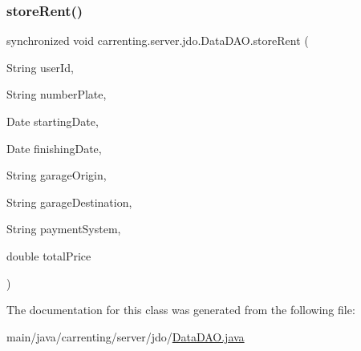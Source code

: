 \mbox{\label{classcarrenting_1_1server_1_1jdo_1_1_data_d_a_o_acf4c9d1e243934c4e900c5f78276d781}} 
\subsubsection{\texorpdfstring{storeRent()}{storeRent()}}
{\footnotesize\ttfamily synchronized void carrenting.\+server.\+jdo.\+Data\+D\+A\+O.\+store\+Rent (\begin{DoxyParamCaption}\item[{String}]{user\+Id,  }\item[{String}]{number\+Plate,  }\item[{Date}]{starting\+Date,  }\item[{Date}]{finishing\+Date,  }\item[{String}]{garage\+Origin,  }\item[{String}]{garage\+Destination,  }\item[{String}]{payment\+System,  }\item[{double}]{total\+Price }\end{DoxyParamCaption})}



The documentation for this class was generated from the following file\+:\begin{DoxyCompactItemize}
\item 
main/java/carrenting/server/jdo/\mbox{\hyperlink{_data_d_a_o_8java}{Data\+D\+A\+O.\+java}}\end{DoxyCompactItemize}
